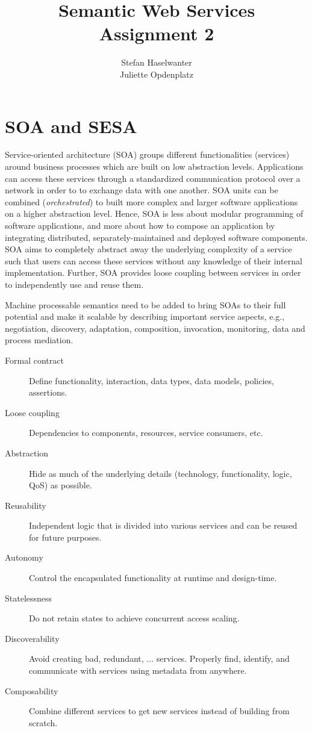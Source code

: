 \documentclass[a4paper]{article}
\title{\textbf{Semantic Web Services}\\\large{Assignment 2}}
\author{Stefan Haselwanter\\Juliette Opdenplatz}
\begin{document}
\maketitle


\section{SOA and SESA}
Service-oriented architecture (SOA) groups different functionalities (services) around business processes which are built on low abstraction levels.
Applications can access these services through a standardized communication protocol over a network in order to to exchange data with one another.
SOA units can be combined (\emph{orchestrated}) to built more complex and larger software applications on a higher abstraction level.
Hence, SOA is less about modular programming of software applications, and more about how to compose an application by integrating distributed, separately-maintained and deployed software components.
SOA aims to completely abstract away the underlying complexity of a service such that users can access these services without any knowledge of their internal implementation.
Further, SOA provides loose coupling between services in order to independently use and reuse them.

Machine processable semantics need to be added to bring SOAs to their full potential and make it scalable by describing important service aspects,
e.g., negotiation, discovery, adaptation, composition, invocation, monitoring, data and process mediation.

\begin{description}
  \item[Formal contract] Define functionality, interaction, data types, data models, policies, assertions.
  \item[Loose coupling] Dependencies to components, resources, service consumers, etc.
  \item[Abstraction] Hide as much of the underlying details (technology, functionality, logic, QoS) as possible.
  \item[Reusability] Independent logic that is divided into various services and can be reused for future purposes.
  \item[Autonomy] Control the encapsulated functionality at runtime and design-time.
  \item[Statelessness] Do not retain states to achieve concurrent access scaling.
  \item[Discoverability] Avoid creating bad, redundant, ... services.
  Properly find, identify, and communicate with services using metadata from anywhere.
  \item[Composability] Combine different services to get new services instead of building from scratch.
\end{description}
\end{document}
